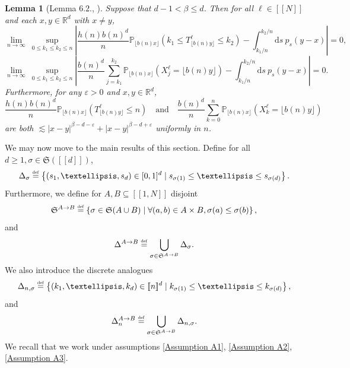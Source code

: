 \documentclass[10pt,a4paper]{amsart}
\newcommand{\RR}{\mathbb R}
\newcommand{\PP}{\mathbb P}
\newcommand{\1}{\mathds{1}}
\renewcommand{\d}{\mathrm d}
\newcommand{\eqdef}{\stackrel{\scaleto{\mathrm{def}}{3.5pt}}{=}}
\newtheorem{lemma}{Lemma}
\numberwithin{equation}{section}
\begin{document}
\begin{lemma}[Lemma $6.2.$, \cite{LeGallRosenRangeOfStableRandomWalks1991}]
\label{lemma:uniform convergence of hitting times}
    Suppose that $d-1<\beta\le d$. Then for all $\ell\in[\![N]\!]$ and each $x,y\in\RR^d$ with $x\neq y$,
    \begin{equation}
    \label{limit:uniform convergence discrete -> continuous I}
        \underset{n\rightarrow\infty}\lim\ \underset{0\le k_1\le k_2\le n}\sup\left|\frac{h(n)b(n)^d}{n}\PP_{\lfloor b(n) x\rfloor}\left(k_1\le T_{\lfloor b(n) y\rfloor}^\ell\le k_2\right)-\int_{k_1/n}^{k_2/n}\d s\ p_s(y-x)\right|=0,
    \end{equation}
    \begin{equation}
    \label{limit:uniform convergence discrete -> continuous II}
        \underset{n\rightarrow\infty}\lim\ \underset{0\le k_1\le k_2\le n}\sup\left|\frac{b(n)^d}{n}\sum_{j=k_1}^{k_2}\PP_{\lfloor b(n)x\rfloor}\left(X_j^\ell=\lfloor b(n) y\rfloor\right)-\int_{k_1/n}^{k_2/n}\d s\ p_s(y-x)\right|=0.
    \end{equation}
    Furthermore, for any $\varepsilon>0$ and $x,y\in\RR^d$,
    \begin{equation}
    \label{ineq:bound for dominated convergence theorem}
       \frac{h(n)b(n)^d}{n}\PP_{\lfloor b(n)x\rfloor}\left(T_{\lfloor b(n) y\rfloor}^\ell\le n\right)\quad\text{and}\quad\frac{b(n)^d}{n}\sum_{k=0}^n\PP_{\lfloor b(n)x\rfloor}\left(X_k^\ell=\lfloor b(n) y\rfloor\right)
    \end{equation}
    are both $\lesssim|x-y|^{\beta-d-\varepsilon}+|x-y|^{\beta-d+\varepsilon}$ uniformly in $n$.
\end{lemma}

We may now move to the main results of this section. Define for all $d\ge1, \sigma\in\mathfrak S([\![d]\!])$,
\begin{equation*}
    \Delta_\sigma\eqdef\left\{(s_1,\dots, s_d)\in[0,1]^d\mid s_{\sigma(1)}\le\dots\le s_{\sigma(d)}\right\}.
\end{equation*}
Furthermore, we define for $A,B\subseteq[\![1,N]\!]$ disjoint
\begin{equation*}
    \mathfrak S^{A\rightarrow B}\eqdef\left\{\sigma\in\mathfrak S(A\cup B)\mid \forall (a,b)\in A\times B,\sigma(a)\le\sigma(b)\right\},
\end{equation*}
and
\begin{equation*}
    \Delta^{A\rightarrow B}\eqdef\bigcup_{\sigma\in\mathfrak S^{A\rightarrow B}}\Delta_\sigma.
\end{equation*}
We also introduce the discrete analogues
\begin{equation*}
    \Delta_{n,\sigma}\eqdef\left\{(k_1,\dots, k_d)\in[\![n]\!]^d\mid k_{\sigma(1)}\le\dots\le k_{\sigma(d)}\right\},
\end{equation*}
and
\begin{equation*}
    \Delta_n^{A\rightarrow B}\eqdef\bigcup_{\sigma\in\mathfrak S^{A\rightarrow B}}\Delta_{n,\sigma}.
\end{equation*}
We recall that we work under assumptions \ref{Assumption A1}, \ref{Assumption A2}, \ref{Assumption A3}.
\end{document}
